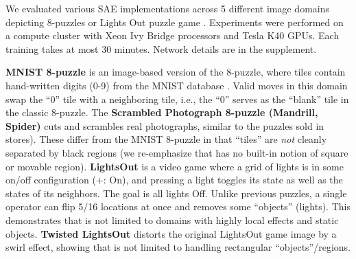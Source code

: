 We evaluated various SAE implementations across 5 different
image domains depicting 8-puzzles or Lights Out puzzle game \cite{lightsout}.
Experiments were performed on a compute cluster with Xeon Ivy Bridge
processors and Tesla K40 GPUs.  Each training takes at most 30 minutes.
Network details are in the supplement.

\textbf{MNIST 8-puzzle}
is an image-based version of the 8-puzzle, where tiles contain hand-written digits (0-9) from the  MNIST database \cite{lecun1998gradient}.
Valid moves in this domain swap the ``0'' tile  with a neighboring tile, i.e., the ``0'' serves as the ``blank'' tile in the classic 8-puzzle. 
The \textbf{Scrambled Photograph 8-puzzle (Mandrill, Spider)} cuts and scrambles real photographs, similar to the puzzles sold in stores).
These differ from the MNIST 8-puzzle in that ``tiles'' are \textit{not} cleanly separated by black regions
(we re-emphasize that \latentplanner has no built-in notion of square or movable region).
\textbf{LightsOut} is
a video game where a grid of lights is in some on/off configuration ($+$: On),
and pressing a light toggles its state as well as the states of its neighbors.
The goal is all lights Off.
Unlike previous puzzles, a single operator can flip 5/16 locations at once and
removes some ``objects'' (lights).
This demonstrates that \latentplanner is not limited to domains with highly local effects and static objects.
\textbf{Twisted LightsOut} distorts the original LightsOut game image by a swirl effect, 
showing that \latentplanner is not limited to handling rectangular ``objects''/regions.

